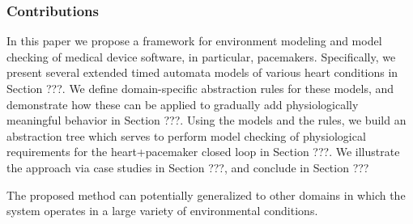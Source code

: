 \subsubsection{Contributions}
In this paper we propose a framework for environment modeling and model checking of medical device software, in particular, pacemakers.
Specifically, we present several extended timed automata models of various heart conditions in Section ???. 
We define domain-specific abstraction rules for these models, and demonstrate how these can be applied to gradually add physiologically meaningful behavior in Section ???. 
Using the models and the rules, we build an abstraction tree which serves to perform model checking of physiological requirements for the heart+pacemaker closed loop in Section ???.
We illustrate the approach via case studies in Section ???, and conclude in Section ???

The proposed method can potentially generalized to other domains in which the system operates in a large variety of environmental conditions.

